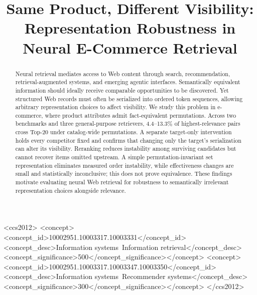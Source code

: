 \documentclass[sigconf,anonymous,review]{acmart}
\title{Same Product, Different Visibility: Representation Robustness in Neural E-Commerce Retrieval}
\begin{document}
\raggedbottom
\begin{abstract}
Neural retrieval mediates access to Web content through search, recommendation, retrieval-augmented systems, and emerging agentic interfaces. Semantically equivalent information should ideally receive comparable opportunities to be discovered. Yet structured Web records must often be serialized into ordered token sequences, allowing arbitrary representation choices to affect visibility. We study this problem in e-commerce, where product attributes admit fact-equivalent permutations. Across two benchmarks and three general-purpose retrievers, 4.4--13.3\% of highest-relevance pairs cross Top-20 under catalog-wide permutations. A separate target-only intervention holds every competitor fixed and confirms that changing only the target's serialization can alter its visibility. Reranking reduces instability among surviving candidates but cannot recover items omitted upstream. A simple permutation-invariant set representation eliminates measured order instability, while effectiveness changes are small and statistically inconclusive; this does not prove equivalence. These findings motivate evaluating neural Web retrieval for robustness to semantically irrelevant representation choices alongside relevance.
\end{abstract}

\begin{CCSXML}
<ccs2012>
 <concept><concept_id>10002951.10003317.10003331</concept_id><concept_desc>Information systems~Information retrieval</concept_desc><concept_significance>500</concept_significance></concept>
 <concept><concept_id>10002951.10003317.10003347.10003350</concept_id><concept_desc>Information systems~Recommender systems</concept_desc><concept_significance>300</concept_significance></concept>
</ccs2012>
\end{CCSXML}

\maketitle









\clearpage


\end{document}
